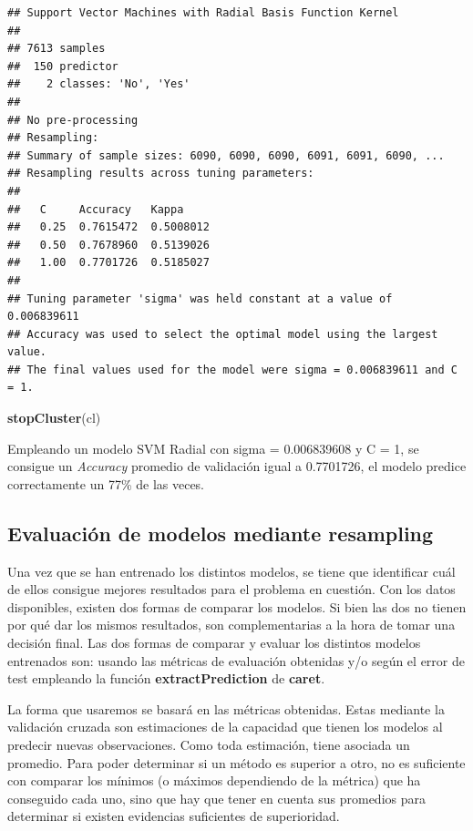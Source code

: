 \documentclass[]{article}
\newenvironment{Shaded}{\begin{snugshade}}{\end{snugshade}}
\newcommand{\KeywordTok}[1]{\textcolor[rgb]{0.13,0.29,0.53}{\textbf{#1}}}
\newcommand{\NormalTok}[1]{#1}
\begin{document}
\begin{verbatim}
## Support Vector Machines with Radial Basis Function Kernel 
## 
## 7613 samples
##  150 predictor
##    2 classes: 'No', 'Yes' 
## 
## No pre-processing
## Resampling: 
## Summary of sample sizes: 6090, 6090, 6090, 6091, 6091, 6090, ... 
## Resampling results across tuning parameters:
## 
##   C     Accuracy   Kappa    
##   0.25  0.7615472  0.5008012
##   0.50  0.7678960  0.5139026
##   1.00  0.7701726  0.5185027
## 
## Tuning parameter 'sigma' was held constant at a value of 0.006839611
## Accuracy was used to select the optimal model using the largest value.
## The final values used for the model were sigma = 0.006839611 and C = 1.
\end{verbatim}

\begin{Shaded}
\begin{Highlighting}[]
\KeywordTok{stopCluster}\NormalTok{(cl)}
\end{Highlighting}
\end{Shaded}

Empleando un modelo SVM Radial con sigma = 0.006839608 y C = 1, se
consigue un \emph{Accuracy} promedio de validación igual a 0.7701726, el
modelo predice correctamente un 77\% de las veces.

\hypertarget{evaluaciuxf3n-de-modelos-mediante-resampling}{%
\subsection{Evaluación de modelos mediante
resampling}\label{evaluaciuxf3n-de-modelos-mediante-resampling}}

Una vez que se han entrenado los distintos modelos, se tiene que
identificar cuál de ellos consigue mejores resultados para el problema
en cuestión. Con los datos disponibles, existen dos formas de comparar
los modelos. Si bien las dos no tienen por qué dar los mismos
resultados, son complementarias a la hora de tomar una decisión final.
Las dos formas de comparar y evaluar los distintos modelos entrenados
son: usando las métricas de evaluación obtenidas y/o según el error de
test empleando la función \textbf{extractPrediction} de \textbf{caret}.

La forma que usaremos se basará en las métricas obtenidas. Estas
mediante la validación cruzada son estimaciones de la capacidad que
tienen los modelos al predecir nuevas observaciones. Como toda
estimación, tiene asociada un promedio. Para poder determinar si un
método es superior a otro, no es suficiente con comparar los mínimos (o
máximos dependiendo de la métrica) que ha conseguido cada uno, sino que
hay que tener en cuenta sus promedios para determinar si existen
evidencias suficientes de superioridad.
\end{document}
